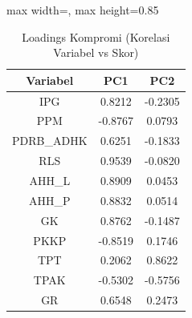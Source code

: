 \begin{table}[H]
\centering
\caption{Loadings Kompromi (Korelasi Variabel vs Skor)} \label{tab:loadings}
\begin{adjustbox}{max width=\textwidth, max height=0.85\textheight}
\begin{tabular}{|c|c|c|}
\hline
\textbf{Variabel} & \textbf{PC1} & \textbf{PC2} \\
\hline
IPG & 0.8212 & -0.2305 \\
PPM & -0.8767 & 0.0793 \\
PDRB\_ADHK & 0.6251 & -0.1833 \\
RLS & 0.9539 & -0.0820 \\
AHH\_L & 0.8909 & 0.0453 \\
AHH\_P & 0.8832 & 0.0514 \\
GK & 0.8762 & -0.1487 \\
PKKP & -0.8519 & 0.1746 \\
TPT & 0.2062 & 0.8622 \\
TPAK & -0.5302 & -0.5756 \\
GR & 0.6548 & 0.2473 \\
\hline
\end{tabular}
\end{adjustbox}
\end{table}